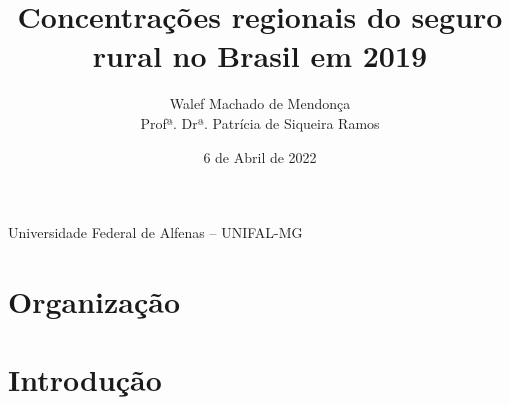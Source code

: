 \documentclass[aspectratio=169]{beamer}
\begin{document}
\title[Defesa TCC]{Concentrações regionais do seguro rural no Brasil em 2019}

\author[Walef Machado de Mendonça]{Walef Machado de Mendonça\\[3mm] Profª. Drª. Patrícia de Siqueira Ramos}
\date{6 de Abril de 2022}

\begin{frame}{}
	\titlepage
	\begin{center}
	\footnotesize
	    Universidade Federal de Alfenas -- UNIFAL-MG
	\end{center}
\end{frame}


\section{Organização}


\section{Introdução}
\end{document}
